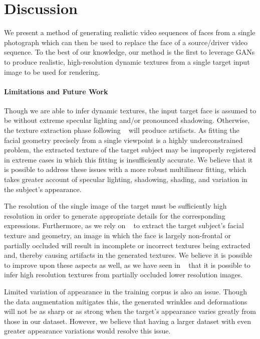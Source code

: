 
\section{Discussion}

We present a method of generating realistic video sequences of faces from a single photograph 
which can then be used to replace the face of a source/driver video sequence. 
To the best of our knowledge, our method is the first
to leverage GANs to produce realistic, high-resolution dynamic textures from a single target input image to be used for rendering.  

\paragraph{Limitations and Future Work}
Though we are able to infer dynamic textures, the input target face is assumed to be without extreme specular lighting and/or pronounced shadowing. Otherwise, the texture extraction phase following ~\cite{f2f} will produce artifacts. As fitting the facial geometry precisely from a single viewpoint is a highly underconstrained problem, the extracted texture of the target subject may be improperly registered in extreme cases in which this fitting is insufficiently accurate. We believe that it is possible to address these issues with a more robust multilinear fitting, which takes greater account of specular lighting, shadowing, shading, and variation in the subject's appearance.

The resolution of the single image of the target must be sufficiently high resolution in order to generate appropriate details for the corresponding expressions. Furthermore, as we rely on ~\cite{f2f} to extract the target subject's facial texture and geometry, an image in which the face is largely non-frontal or partially occluded will result in incomplete or incorrect textures being extracted and, thereby causing artifacts in the generated textures.  We believe it is possible to improve upon these aspects as well, as we have seen in ~\cite{saito2016} that it is possible to infer high resolution textures from partially occluded lower resolution images.  

Limited variation of appearance in the training corpus is also an issue.  Though the data augmentation mitigates this, the generated wrinkles and deformations will not be as sharp or as strong when the target's appearance varies greatly from those in our dataset.  However, we believe that having a larger dataset with even greater appearance variations would resolve this issue.

\vfill\eject


